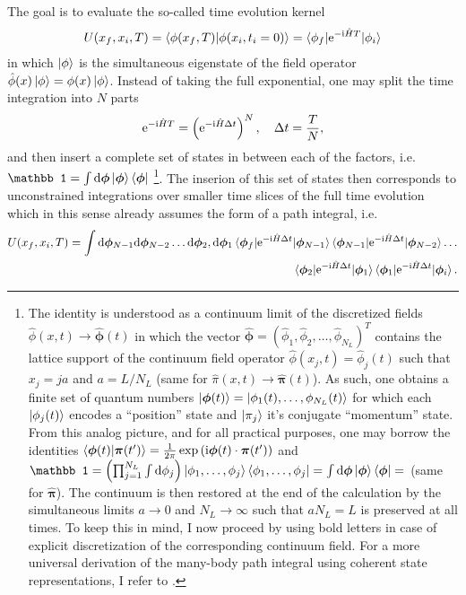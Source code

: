 The goal is to evaluate the so-called time evolution kernel
\begin{align}
    U(x_f,x_i,T) = \braket{\phi(x_f,T)|\phi(x_i,t_i=0)}=\braket{\phi_f|\mathrm e^{-\mathrm i\hat H T}|\phi_i}
\end{align}
in which $\ket{\phi}$ is the simultaneous eigenstate of the field operator $\hat\phi(x)\ket{\phi}=\phi(x)\ket{\phi}$.
Instead of taking the full exponential, one may split the time integration into $N$ parts
\begin{align}
    \mathrm e^{-\mathrm i\hat HT}=\left( \mathrm e^{-\mathrm i\hat H\Delta t} \right)^N
    ,
    \quad
    \Delta t = \frac TN
    ,
\end{align}
and then insert a complete set of states in between each of the factors, i.e. $\mathbb 1=\int\rd\bm\phi\ket{\bm\phi}\bra{\bm\phi}$
\footnote{
    The identity is understood as a continuum limit of the discretized fields $\hat\phi(x,t)\rightarrow{\hat{\bm\phi}}(t)$ in which the vector $\hat{\bm\phi}=(\hat\phi_1,\hat\phi_2,\dots,\hat\phi_{N_L})^T$ contains the lattice support of the continuum field operator $\hat\phi(x_j,t)=\hat\phi_j(t)$ such that $x_j=ja$ and $a=L/N_L$ (same for $\hat\pi(x,t)\rightarrow\hat{\bm\pi}(t)$).
    As such, one obtains a finite set of quantum numbers $\ket{\bm\phi(t)}=\ket{\phi_1(t),\dots,\phi_{N_L}(t)}$ for which each $\ket{\phi_j(t)}$ encodes a ``position'' state and $\ket{\pi_j}$ it's conjugate ``momentum'' state.
    From this analog picture, and for all practical purposes, one may borrow the identities $\braket{\bm\phi(t)|\bm\pi(t')}=\frac1{2\pi}\exp\left( \mathrm i\bm\phi(t)\cdot\bm\pi(t') \right)$ and $\mathbb1=\brlr{\prod_{j=1}^{N_L}\int\rd\phi_j}\ket{\phi_1,\dots,\phi_j}\bra{\phi_1,\dots,\phi_j}=\int\rd\bm\phi\ket{\bm\phi}\bra{\bm\phi}=$ (same for $\hat{\bm\pi}$).
    The continuum is then restored at the end of the calculation by the simultaneous limits $a\rightarrow0$ and $N_L\rightarrow\infty$ such that $aN_L=L$ is preserved at all times.
    To keep this in mind, I now proceed by using bold letters in case of explicit discretization of the corresponding continuum field.
    For a more universal derivation of the many-body path integral using coherent state representations, I refer to \cite{AltlandSimons2010}.
}.
The inserion of this set of states then corresponds to unconstrained integrations over smaller time slices of the full time evolution which in this sense already assumes the form of a path integral, i.e.
\begin{align}
    U(x_f,x_i,T) =
    \int{\mathrm d{\bm\phi}_{N-1}\mathrm d{\bm\phi}_{N-2}\dots\mathrm d{\bm\phi}_2,\mathrm d{\bm\phi}_1}
    \braket{\bm\phi_f|\mathrm e^{-\mathrm i\hat H\Delta t}|\bm\phi_{N-1}}
    \braket{\bm\phi_{{N-1}}|\mathrm e^{-\mathrm i\hat H\Delta t}|\bm\phi_{{N-2}}}
    \dots
    \nonumber\\
    \braket{\bm\phi_{2}|\mathrm e^{-\mathrm i\hat H\Delta t}|\bm\phi_{1}}
    \braket{\bm\phi_{1}|\mathrm e^{-\mathrm i\hat H\Delta t}|\bm\phi_i}.
\end{align}
